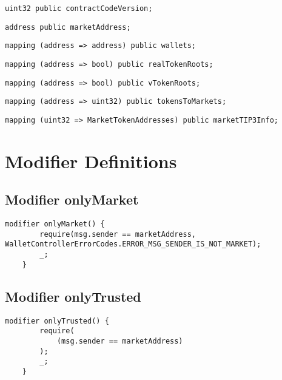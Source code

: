 \begin{lstlisting}[firstnumber=29]
    uint32 public contractCodeVersion;
\end{lstlisting}

\begin{lstlisting}[firstnumber=31]
    address public marketAddress;
\end{lstlisting}

\begin{lstlisting}[firstnumber=34]
    mapping (address => address) public wallets;
\end{lstlisting}

\begin{lstlisting}[firstnumber=35]
    mapping (address => bool) public realTokenRoots;
\end{lstlisting}

\begin{lstlisting}[firstnumber=36]
    mapping (address => bool) public vTokenRoots;
\end{lstlisting}

\begin{lstlisting}[firstnumber=37]
    mapping (address => uint32) public tokensToMarkets;
\end{lstlisting}

\begin{lstlisting}[firstnumber=39]
    mapping (uint32 => MarketTokenAddresses) public marketTIP3Info;
\end{lstlisting}

\section{Modifier Definitions}


\subsection{Modifier onlyMarket}


\begin{lstlisting}[firstnumber=295]
    modifier onlyMarket() {
        require(msg.sender == marketAddress, WalletControllerErrorCodes.ERROR_MSG_SENDER_IS_NOT_MARKET);
        _;
    }
\end{lstlisting}

\subsection{Modifier onlyTrusted}


\begin{lstlisting}[firstnumber=300]
    modifier onlyTrusted() {
        require(
            (msg.sender == marketAddress)
        );
        _;
    }
\end{lstlisting}

